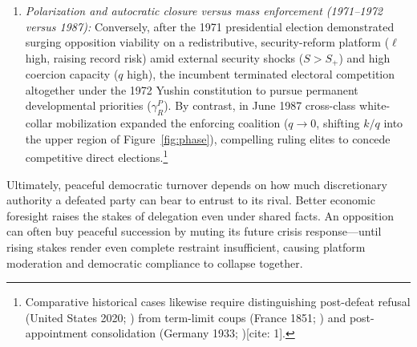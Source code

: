 \begin{enumerate}
\item \emph{Polarization and autocratic closure versus mass enforcement (1971--1972 versus 1987):} Conversely, after the 1971 presidential election demonstrated surging opposition viability on a redistributive, security-reform platform ($\ell$ high, raising record risk) amid external security shocks ($S>S_+$) and high coercion capacity ($q$ high), the incumbent terminated electoral competition altogether under the 1972 Yushin constitution to pursue permanent developmental priorities ($\gamma_R^P$). By contrast, in June 1987 cross-class white-collar mobilization expanded the enforcing coalition ($q\to 0$, shifting $k/q$ into the upper region of Figure~\ref{fig:phase}), compelling ruling elites to concede competitive direct elections.\footnote{Comparative historical cases likewise require distinguishing post-defeat refusal (United States 2020; ) from term-limit coups (France 1851; ) and post-appointment consolidation (Germany 1933; )[cite: 1].}
\end{enumerate}

Ultimately, peaceful democratic turnover depends on how much discretionary authority a defeated party can bear to entrust to its rival. Better economic foresight raises the stakes of delegation even under shared facts. An opposition can often buy peaceful succession by muting its future crisis response---until rising stakes render even complete restraint insufficient, causing platform moderation and democratic compliance to collapse together.

